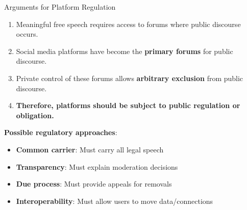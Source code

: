 ﻿\documentclass[aspectratio=169]{beamer}
\begin{document}
\begin{frame}{Arguments for Platform Regulation}
\begin{argumentbox}
\begin{enumerate}
    \item Meaningful free speech requires access to forums where public discourse occurs.
    \item Social media platforms have become the \textbf{primary forums} for public discourse.
    \item Private control of these forums allows \textbf{arbitrary exclusion} from public discourse.
    \item[\textbf{C.}] \textbf{Therefore, platforms should be subject to public regulation or obligation.}
\end{enumerate}
\end{argumentbox}

\vspace{0.2cm}
\textbf{Possible regulatory approaches}:
\begin{itemize}
    \item \textbf{Common carrier}: Must carry all legal speech
    \item \textbf{Transparency}: Must explain moderation decisions
    \item \textbf{Due process}: Must provide appeals for removals
    \item \textbf{Interoperability}: Must allow users to move data/connections
\end{itemize}
\end{frame}
\end{document}
